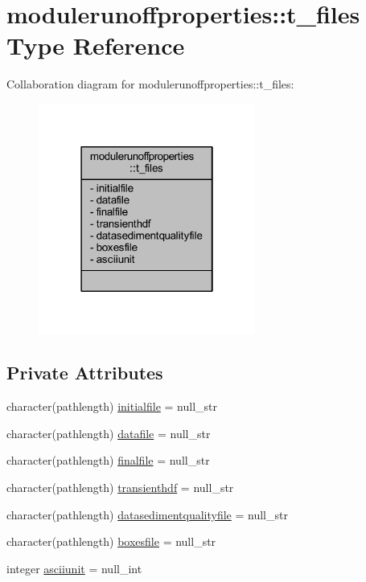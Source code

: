 \hypertarget{structmodulerunoffproperties_1_1t__files}{}\section{modulerunoffproperties\+:\+:t\+\_\+files Type Reference}
\label{structmodulerunoffproperties_1_1t__files}


Collaboration diagram for modulerunoffproperties\+:\+:t\+\_\+files\+:\nopagebreak
\begin{figure}[H]
\begin{center}
\leavevmode
\includegraphics[width=202pt]{structmodulerunoffproperties_1_1t__files__coll__graph}
\end{center}
\end{figure}
\subsection*{Private Attributes}
\begin{DoxyCompactItemize}
\item 
character(pathlength) \mbox{\hyperlink{structmodulerunoffproperties_1_1t__files_a1e198655b493af492685aa9ced71a634}{initialfile}} = null\+\_\+str
\item 
character(pathlength) \mbox{\hyperlink{structmodulerunoffproperties_1_1t__files_a58f4aca0a14802eefa4b1692454e8130}{datafile}} = null\+\_\+str
\item 
character(pathlength) \mbox{\hyperlink{structmodulerunoffproperties_1_1t__files_aa082f9e469382060f4731b95f69e05a5}{finalfile}} = null\+\_\+str
\item 
character(pathlength) \mbox{\hyperlink{structmodulerunoffproperties_1_1t__files_aaaa01bbec06e8e02ae9d77b773f92acf}{transienthdf}} = null\+\_\+str
\item 
character(pathlength) \mbox{\hyperlink{structmodulerunoffproperties_1_1t__files_a6d28152d907b368c71167b5232b27dcb}{datasedimentqualityfile}} = null\+\_\+str
\item 
character(pathlength) \mbox{\hyperlink{structmodulerunoffproperties_1_1t__files_abcd0b46a294d732ac8ca02ae74b2b3ac}{boxesfile}} = null\+\_\+str
\item 
integer \mbox{\hyperlink{structmodulerunoffproperties_1_1t__files_aca01b0c27600953a5252295a4d60fe38}{asciiunit}} = null\+\_\+int
\end{DoxyCompactItemize}



